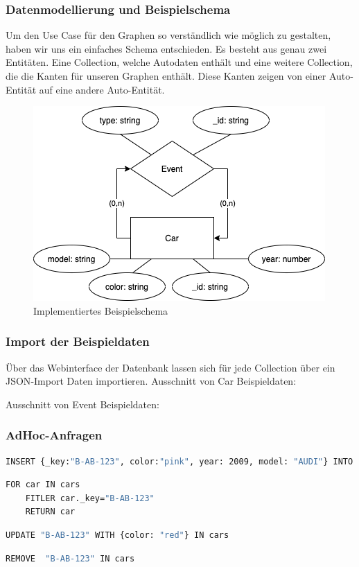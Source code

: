 \subsubsection{Datenmodellierung und Beispielschema}
Um den Use Case für den Graphen so verständlich wie möglich zu gestalten, haben wir uns ein einfaches Schema entschieden. Es besteht aus genau zwei Entitäten. Eine Collection, welche Autodaten enthält und eine weitere Collection, die die Kanten für unseren Graphen enthält. Diese Kanten zeigen von einer Auto-Entität auf eine andere Auto-Entität.
\begin{figure}[htbp] 
  	\centering
     \includegraphics[width=.7\textwidth]{./images/8.Schema.png}
 	\caption{Implementiertes Beispielschema}
  \label{fig:DataSchema}
\end{figure}
\subsubsection{Import der Beispieldaten}
Über das Webinterface der Datenbank lassen sich für jede Collection über ein \ac{JSON}-Import Daten importieren.
Ausschnitt von Car Beispieldaten:

Ausschnitt von Event Beispieldaten:

\subsubsection{AdHoc-Anfragen}
\begin{lstlisting}[language=bash, caption=CREATE von Auto]
INSERT {_key:"B-AB-123", color:"pink", year: 2009, model: "AUDI"} INTO cars
\end{lstlisting}

\begin{lstlisting}[language=bash, caption=SELECT von Auto]
FOR car IN cars
	FITLER car._key="B-AB-123"
	RETURN car
\end{lstlisting}

\begin{lstlisting}[language=bash, caption=UPDATE von Auto]
UPDATE "B-AB-123" WITH {color: "red"} IN cars
\end{lstlisting}

\begin{lstlisting}[language=bash, caption=DELETE von Auto]
REMOVE  "B-AB-123" IN cars
\end{lstlisting}
